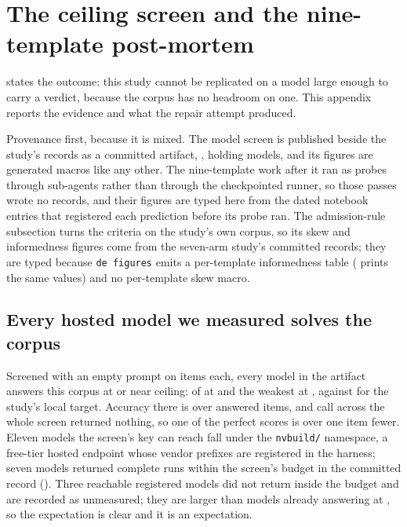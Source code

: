 \section{The ceiling screen and the nine-template post-mortem}
\label{sec:ceiling}


 states the outcome: this study cannot be replicated
on a model large enough to carry a verdict, because the corpus has no
headroom on one. This appendix reports the evidence and what the repair
attempt produced.

Provenance first, because it is mixed. The model screen is published beside
the study's records as a committed artifact,
, holding \NUM{\screenModels} models, and
its figures are generated macros like any other. The nine-template work after
it ran as probes through sub-agents rather than through the checkpointed
runner, so those passes wrote no records, and their figures are typed here
from the dated notebook entries that registered each prediction before its
probe ran. The admission-rule subsection turns the criteria on the study's
own corpus, so its skew and informedness figures come from the seven-arm
study's committed records; they are typed because \texttt{de figures} emits a
per-template informedness table ( prints the same
values) and no per-template skew macro.

\subsection{Every hosted model we measured solves the corpus}

Screened with an empty prompt on \NUM{\screenItems} items each, every model
in the artifact answers this corpus at or near ceiling:
\NUM{\screenAtCeiling} of \NUM{\screenModels} at \NUM{\screenBest} and the
weakest at \NUM{\screenWorst}, against \NUM{\accUnseenOff} for the study's
local target. Accuracy there is over answered items, and
\NUM{\screenUnanswered} call across the whole screen returned nothing, so one
of the perfect scores is over one item fewer. Eleven models the screen's key
can reach fall under the \texttt{nvbuild/} namespace, a free-tier hosted
endpoint whose vendor prefixes are registered in the harness; seven models
returned complete runs within the screen's budget in the committed record
(). Three reachable registered models did not
return inside the budget and are recorded as unmeasured; they are larger than
models already answering at \NUM{\screenBest}, so the expectation is clear and
it is an expectation.

